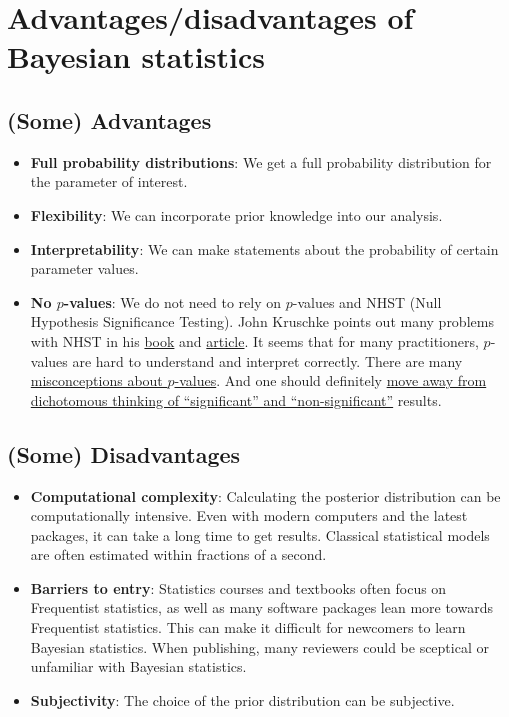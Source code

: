 \documentclass[
]{book}
\begin{document}
\section{Advantages/disadvantages of Bayesian statistics}\label{advantagesdisadvantages-of-bayesian-statistics}

\subsection{(Some) Advantages}\label{some-advantages}

\begin{itemize}
\item
  \textbf{Full probability distributions}: We get a full probability distribution for the parameter of interest.
\item
  \textbf{Flexibility}: We can incorporate prior knowledge into our analysis.
\item
  \textbf{Interpretability}: We can make statements about the probability of certain parameter values.
\item
  \textbf{No \(p\)-values}: We do not need to rely on \(p\)-values and NHST (Null Hypothesis Significance Testing).
  John Kruschke points out many problems with
  NHST in his \href{https://nyu-cdsc.github.io/learningr/assets/kruschke_bayesian_in_R.pdf}{book} and
  \href{https://gwern.net/doc/statistics/bayes/2012-kruschke.pdf}{article}. It seems that for many practitioners, \(p\)-values are
  hard to understand and interpret correctly. There are many
  \href{https://www.sciencedirect.com/science/article/abs/pii/S0037196308000620}{misconceptions about \(p\)-values}.
  And one should definitely
  \href{https://www.tandfonline.com/doi/full/10.1080/00031305.2019.1583913}{move away from dichotomous thinking of ``significant'' and ``non-significant''} results.
\end{itemize}

\subsection{(Some) Disadvantages}\label{some-disadvantages}

\begin{itemize}
\item
  \textbf{Computational complexity}: Calculating the posterior distribution can be computationally intensive.
  Even with modern computers and the latest packages, it can take a long time to get results. Classical statistical models
  are often estimated within fractions of a second.
\item
  \textbf{Barriers to entry}: Statistics courses and textbooks often focus on Frequentist statistics, as well as many
  software packages lean more towards Frequentist statistics. This can make it difficult for newcomers to learn Bayesian statistics.
  When publishing, many reviewers could be sceptical or unfamiliar with Bayesian statistics.
\item
  \textbf{Subjectivity}: The choice of the prior distribution can be subjective.
\end{itemize}
\end{document}
